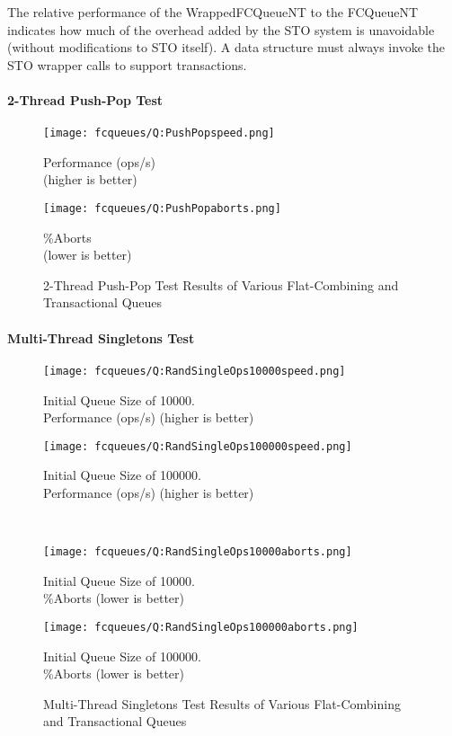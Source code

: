 The relative performance of the WrappedFCQueueNT to the FCQueueNT indicates how much of the overhead added by the STO system is unavoidable (without modifications to STO itself). A data structure must always invoke the STO wrapper calls to support transactions. 

\paragraph{2-Thread Push-Pop Test}
\begin{figure}[ht!]
    \centering
    \begin{minipage}{0.45\textwidth}
    \centering
    \texttt{[image: fcqueues/Q:PushPopspeed.png]}
    \caption*{Performance (ops/s)\\(higher is better)}
    \end{minipage}
    \begin{minipage}{0.45\textwidth}
    \centering
    \texttt{[image: fcqueues/Q:PushPopaborts.png]}
    \caption*{\%Aborts\\(lower is better)}
    \end{minipage}
\caption{2-Thread Push-Pop Test Results of Various Flat-Combining and Transactional Queues}
\label{fig:fcqueues_queues}
\end{figure}

\paragraph{Multi-Thread Singletons Test}
\begin{figure}[ht!]
    \centering
    \begin{minipage}{0.45\textwidth}
    \centering
    \texttt{[image: fcqueues/Q:RandSingleOps10000speed.png]}
    \caption*{Initial Queue Size of 10000.\\Performance (ops/s) (higher is better)}
    \end{minipage}
    \begin{minipage}{0.45\textwidth}
    \centering
    \texttt{[image: fcqueues/Q:RandSingleOps100000speed.png]}
    \caption*{Initial Queue Size of 100000.\\Performance (ops/s) (higher is better)}
    \end{minipage}
    \\
    \begin{minipage}{0.45\textwidth}
    \centering
    \texttt{[image: fcqueues/Q:RandSingleOps10000aborts.png]}
    \caption*{Initial Queue Size of 10000.\\\%Aborts (lower is better)}
    \end{minipage}
    \begin{minipage}{0.45\textwidth}
    \centering
    \texttt{[image: fcqueues/Q:RandSingleOps100000aborts.png]}
    \caption*{Initial Queue Size of 100000.\\\%Aborts (lower is better)}
    \end{minipage}
\caption{Multi-Thread Singletons Test Results of Various Flat-Combining and Transactional Queues}
\label{fig:txnal_queues}
\end{figure}

